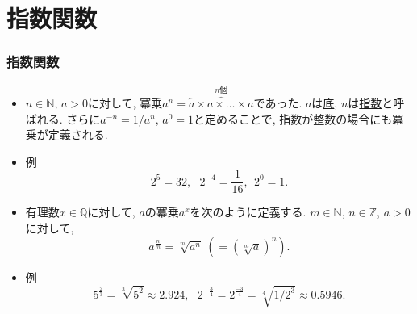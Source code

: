 \documentclass[dvipdfmx,cjk,10.2pt]{beamer}
\newcommand{\Q}{\mathbb{Q}}
\newcommand{\Z}{\mathbb{Z}}
\newcommand{\N}{\mathbb{N}}
\theoremstyle{definition}
\begin{document}

\section{指数関数}


\begin{frame}
\frametitle{指数関数}

\begin{itemize}
\item  $n\in \N$, $a >0$に対して, 冪乗$a^n =\overbrace{ a \times a \times \dots \times a}^\text{$n$個}$であった. 
$a$は\underline{底}, $n$は\underline{指数}と呼ばれる. 
さらに$a^{-n}=1/a^n$, $a^0=1$と定めることで, 指数が整数の場合にも冪乗が定義される. 
\item 例
$$
2^5=32, \ \ \ 2^{-4}=\frac{1}{16}, \ \ 2^0=1. 
$$
\item 有理数$x \in \Q$に対して, $a$の冪乗$a^x$を次のように定義する. 
$m \in \N$, $n\in \Z$, $a>0$に対して, 
$$
a^{\frac{n}{m}}=\sqrt[m]{a^n} \ (=(\sqrt[m]{a})^n). 
$$
\item 例
$$
5^{\frac{2}{3}}=\sqrt[3]{5^2} \approx 2.924,  \ \ \ 2^{-\frac{3}{4}}=2^{\frac{-3}{4}}=\sqrt[4]{1/2^3} \approx 0.5946.  
$$
\end{itemize}



\end{frame}


\end{document}
